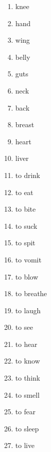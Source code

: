 \begin{enumerate}
\item   knee 

\item   hand 

\item   wing 

\item   belly 

\item   guts 

\item   neck 

\item   back 

\item   breast 

\item   heart 

\item   liver 

\item   to drink 

\item   to eat 

\item   to bite 

\item   to suck 

\item   to spit 

\item   to vomit 

\item   to blow 

\item   to breathe 

\item   to laugh 

\item   to see 

\item   to hear 

\item   to know 

\item   to think 

\item   to smell 

\item   to fear 

\item   to sleep 

\item   to live 


\end{enumerate}
